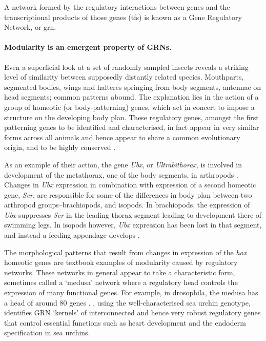 A network formed by the regulatory interactions between genes and the transcriptional products of those genes (\glspl{tf}) is known as a Gene Regulatory Network, or \gls{grn}.

\paragraph{Modularity is an emergent property of GRNs.}
Even a superficial look at a set of randomly sampled insects reveals a striking level of similarity between supposedly distantly related species. Mouthparts, segmented bodies, wings and halteres springing from body segments, antennae on head segments; common patterns abound. The explanation lies in the action of a group of homeotic (or body-patterning) genes, which act in concert to impose a structure on the developing body plan. These regulatory genes, amongst the first patterning genes to be identified and characterised, in fact appear in very similar forms across all animals and hence appear to share a common evolutionary origin, and to be highly conserved \parencite{Shubin:2009vw}. 

As an example of their action, the gene \emph{Ubx}, or \emph{Ultrabithorax}, is involved in development of the \gls{metathorax}, one of the body segments, in \glspl{arthropod} \parencite[pg. 696-697]{Watson:2008fm}. Changes in \emph{Ubx} expression in combination with expression of a second homeotic gene, \emph{Scr}, are responsible for some of the differences in body plan between two arthropod groups--brachiopods, and isopods. In brachiopods, the expression of \emph{Ubx} suppresses \emph{Scr} in the leading thorax segment leading to development there of swimming legs. In isopods however, \emph{Ubx} expression has been lost in that segment, and instead a feeding appendage develops \parencite{Watson:2008fm}.

The morphological patterns that result from changes in expression of the \emph{hox} homeotic genes are textbook examples of modularity caused by regulatory networks. These networks in general appear to take a characteristic form, sometimes called a `medusa' network \parencite{Kauffman:2004zi,Aldana:2007da} where a regulatory head controls the expression of many functional genes. For example, in \gls{drosophila}, the medusa has a head of around 80 genes \parencite{Aldana:2007da}. \Textcite{Davidson:2006wi}, using the well-characterised sea urchin genotype, identifies GRN `kernels' of interconnected and hence very robust regulatory genes that control essential functions such as heart development and the endoderm specification in sea urchins. 

